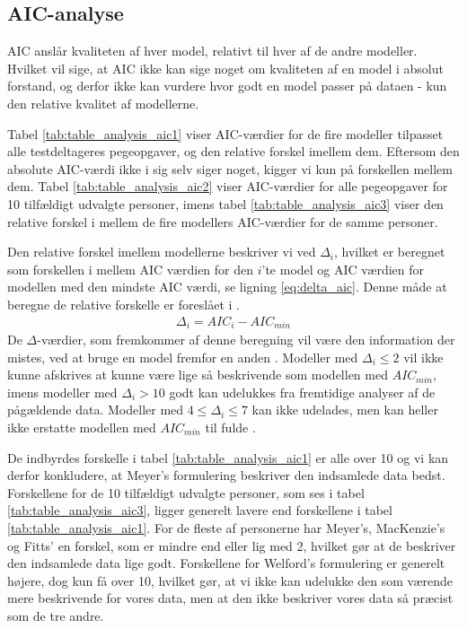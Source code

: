 \subsection*{AIC-analyse}
AIC anslår kvaliteten af hver model, relativt til hver af de andre modeller. Hvilket vil sige, at AIC ikke kan sige noget om kvaliteten af en model i absolut forstand, og derfor ikke kan vurdere hvor godt en model passer på dataen - kun den relative kvalitet af modellerne.

Tabel \ref{tab:table_analysis_aic1} viser AIC-værdier for de fire modeller tilpasset alle testdeltageres pegeopgaver, og den relative forskel imellem dem. Eftersom den absolute AIC-værdi ikke i sig selv siger noget, kigger vi kun på forskellen mellem dem. Tabel \ref{tab:table_analysis_aic2} viser AIC-værdier for alle pegeopgaver for 10 tilfældigt udvalgte personer, imens tabel \ref{tab:table_analysis_aic3} viser den relative forskel i mellem de fire modellers AIC-værdier for de samme personer.

Den relative forskel imellem modellerne beskriver vi ved $\Delta_i$, hvilket er beregnet som forskellen i mellem AIC værdien for den $i$'te model og AIC værdien for modellen med den mindste AIC værdi, se ligning \ref{eq:delta_aic}. Denne måde at beregne de relative forskelle er foreslået i \cite{burnham2004}.
\begin{align}
\Delta_i = AIC_i - AIC_{min}
\label{eq:delta_aic}
\end{align} 
De $\Delta$-værdier, som fremkommer af denne beregning vil være den information der mistes, ved at bruge en model fremfor en anden \cite{burnham2004}. Modeller med $\Delta_i \leq 2$ vil ikke kunne afskrives at kunne være lige så beskrivende som modellen med $AIC_{min}$, imens modeller med $\Delta_i > 10$ godt kan udelukkes fra fremtidige analyser af de pågældende data. Modeller med $4 \leq \Delta_i \leq 7$ kan ikke udelades, men kan heller ikke erstatte modellen med $AIC_{min}$ til fulde \cite{burnham2004}.

De indbyrdes forskelle i tabel \ref{tab:table_analysis_aic1} er alle over 10 og vi kan derfor konkludere, at Meyer's formulering beskriver den indsamlede data bedst. Forskellene for de 10 tilfældigt udvalgte personer, som ses i tabel \ref{tab:table_analysis_aic3}, ligger generelt lavere end forskellene i tabel \ref{tab:table_analysis_aic1}. For de fleste af personerne har Meyer's, MacKenzie's og Fitts' en forskel, som er mindre end eller lig med 2, hvilket gør at de beskriver den indsamlede data lige godt. Forskellene for Welford's formulering er generelt højere, dog kun få over 10, hvilket gør, at vi ikke kan udelukke den som værende mere beskrivende for vores data, men at den ikke beskriver vores data så præcist som de tre andre. 

